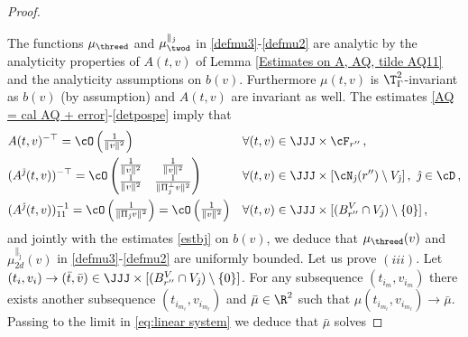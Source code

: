 \documentclass[11pt,a4paper,reqno]{article}
\numberwithin{equation}{section}
\theoremstyle{definition}
\begin{document}
\begin{proof}
{\begin{itemize}
        \end{itemize}}
The functions $ \mu_{\threed} $
and $ \mu^{\parallel_{\hat \jmath}}_{\twod} $ in \eqref{defmu3}-\eqref{defmu2} are  analytic by 
the analyticity properties of 
$ A(t,v) $ of 
     Lemma \ref{Estimates on A, AQ, tilde AQ11} and 
the analyticity 
assumptions on $ b(v) $.  
Furthermore  $\mu(t,v)$ is $\T^2_\Gamma $-invariant as $b(v) $ (by assumption) and $ A(t,v)$ are invariant as well.
The estimates   
    \eqref{AQ = cal AQ + error}-\eqref{detpospe} imply that
        \begin{equation}\label{eq:inverse di A}
        \begin{aligned}
        &     A(t,v)^{-\top}=\cO\begin{pmatrix}\frac1{\|v\|^2}\end{pmatrix} & &
            \forall (t,v)\in \JJJ\times \cF_{r''}\, , \\
         &    (A^{\hat \jmath}(t,v))^{-\top}=\cO\begin{pmatrix}
                \frac1{\|v\|^2} & \frac1{\|v\|^2}\\
                \frac1{\|v\|^2} & \frac1{\|\Pi_{\hat \jmath}^\bot v \|^2}
            \end{pmatrix} & &
            \forall 
            (t,v)\in \JJJ\times [\cN_{\hat \jmath}(r'')\setminus V_{\hat \jmath}]\, , \ \hat \jmath\in\cD \, ,  \\
        &     (A^{\hat \jmath}(t,v))_{11}^{-1}=\cO\begin{pmatrix}\frac1{\|\Pi_{\hat \jmath} v\|^2}\end{pmatrix} = \cO\begin{pmatrix}\frac1{\|v\|^2}\end{pmatrix} & &
            \forall (t,v)\in \JJJ\times [(B_{r''}^V\cap V_{\hat \jmath})\setminus\{0\}]\, ,
        \end{aligned}
        \end{equation}
        and jointly with  
        the estimates \eqref{estbj} on $b(v)$, we deduce  
        that $\mu_{\threed}(v)$ and
        $        \mu^{\parallel_{\hat \jmath}}_{2d} (v)$ 
        in \eqref{defmu3}-\eqref{defmu2} 
        are uniformly bounded.
 Let us prove $(iii)$.
        Let $(t_i,v_i)\to (\bar t,\bar v)\in 
        \JJJ\times [(B_{r''}^V\cap V_{\hat \jmath})\setminus\{0\}]$.
        For any subsequence $(t_{i_m},v_{i_m})$ there exists another subsequence $(t_{i_{m_\ell}},v_{i_{m_\ell}})$ and $ \bar \mu\in \R^2 $ such that $\mu(t_{i_{m_\ell}},v_{i_{m_\ell}})\to \bar \mu $.
        Passing to the limit in \eqref{eq:linear system} we deduce that $\bar \mu$ solves  

\end{proof}
\end{document}
